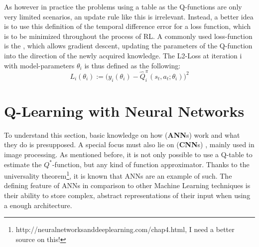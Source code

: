 As however in practice the problems using a table as the Q-functions are only very limited scenarios, an update rule like this is irrelevant. Instead, a better idea is to use this definition of the temporal difference error for a loss function, which is to be minimized throughout the process of RL. A commonly used loss-function is the , which allows gradient descent, updating the parameters of the Q-function into the direction of the newly acquired knowledge. The L2-Loss at iteration i with model-parameters $\theta_i$ is thus defined as the following:
\begin{equation} \label{l2loss}
	L_i(\theta_i) := \Big( y_i(\theta_i) - \hat{Q}_i^\pi(s_t, a_t; \theta_i)\Big)^2
\end{equation}



%

\section{Q-Learning with Neural Networks}

To understand this section, basic knowledge on how  (\textbf{ANN}s) work and what they do is presupposed. A special focus must also lie on  (\textbf{CNN}s) \cite{yann_lecun_gradient-based_1998}, mainly used in image processing. As mentioned before, it is not only possible to use a Q-table to estimate the $Q^*$-function, but any kind of function approximator. Thanks to the universality theorem\footnote{http://neuralnetworksanddeeplearning.com/chap4.html, I need a better source on this!}, it is known that ANNs are an example of such. The defining feature of ANNs in comparison to other Machine Learning techniques is their ability to store complex, abstract representations of their input when using a  enough architecture.

